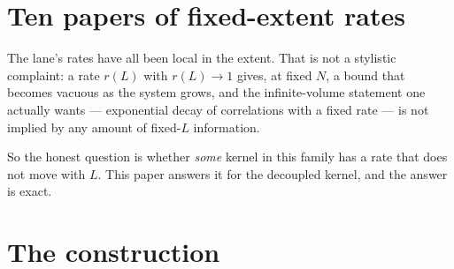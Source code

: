 \documentclass[11pt]{article}
\theoremstyle{definition}
\newcommand{\SU}{\mathrm{SU}}
\begin{document}
\begin{abstract}
\textbf{Not proved, and a gate we failed to respect.}  The \emph{coupled} kernel
is untouched.  Before any of this was written we pre-registered two falsifiable
predictions.  The first --- the decoupled rate is exactly $\tanh\beta$ ---
passed on its pre-registered grid to $10^{-16}$; the statement for \emph{all}
$L\ge1$ is then proved in Lean, not measured.  The second --- the coupled uniformity boundary
is the Onsager curve --- failed on one of eight cells.  \textbf{The script we
committed had a single joint gate, and with the second prediction failing that
gate read \texttt{FAIL -- do not fabricate}.  We fabricated anyway.}  The
theorems below do not depend on either prediction and stand on their proofs; the
\emph{process} claim does not, and \S\ref{sec:scope} records the violation
rather than reinterpreting the gate after the fact.  The Onsager boundary claim
is reported as \textbf{not established}.  At constant source weight the Gibbs
measure factorises across spatial \emph{sites} into $L$ independent
one-dimensional temporal chains --- the slices $X_0,\dots,X_N$ themselves stay
coupled in time, which is what the rate $\tanh\beta$ measures --- so what is
proved here is a statement about a product measure over sites; that is exactly
why it is reachable, and it is said here rather than left to be noticed.  Reflection positivity is
untouched, and nothing in this paper is a claim about $\SU(N)$, the continuum
limit, or the Yang--Mills mass gap \cite{Clay}.
\end{abstract}

\section{Ten papers of fixed-extent rates}\label{sec:debt}

The lane's rates have all been local in the extent.  That is not a stylistic
complaint: a rate $r(L)$ with $r(L)\to 1$ gives, at fixed $N$, a bound that
becomes vacuous as the system grows, and the infinite-volume statement one
actually wants --- exponential decay of correlations with a fixed rate --- is
not implied by any amount of fixed-$L$ information.

So the honest question is whether \emph{some} kernel in this family has a rate
that does not move with $L$.  This paper answers it for the decoupled kernel,
and the answer is exact.

\section{The construction}\label{sec:constr}
\end{document}
